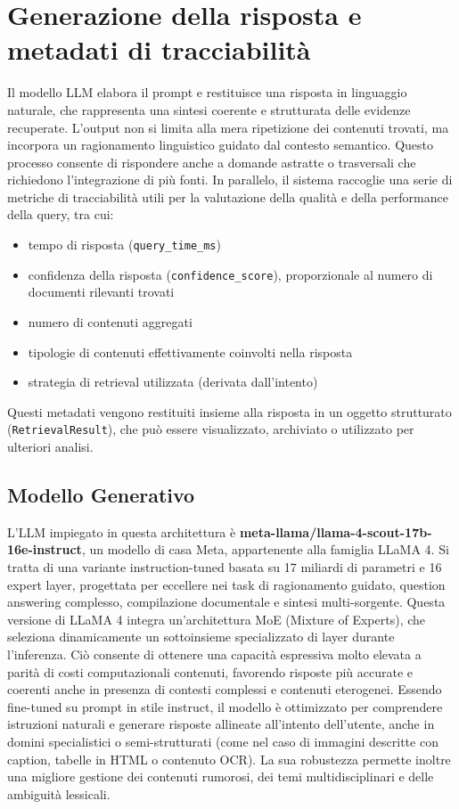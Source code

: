\section{Generazione della risposta e metadati di tracciabilità}
Il modello LLM elabora il prompt e restituisce una risposta in linguaggio naturale, che rappresenta una sintesi coerente e strutturata delle evidenze recuperate. L’output non si limita alla mera ripetizione dei contenuti trovati, ma incorpora un ragionamento linguistico guidato dal contesto semantico. Questo processo consente di rispondere anche a domande astratte o trasversali che richiedono l’integrazione di più fonti.
In parallelo, il sistema raccoglie una serie di metriche di tracciabilità utili per la valutazione della qualità e della performance della query, tra cui:
\begin{itemize}
    \item tempo di risposta (\verb|query_time_ms|)
    \item confidenza della risposta (\verb|confidence_score|), proporzionale al numero di documenti rilevanti trovati
    \item numero di contenuti aggregati
    \item tipologie di contenuti effettivamente coinvolti nella risposta
    \item strategia di retrieval utilizzata (derivata dall’intento)
\end{itemize}
Questi metadati vengono restituiti insieme alla risposta in un oggetto strutturato (\verb|RetrievalResult|), che può essere visualizzato, archiviato o utilizzato per ulteriori analisi.
\subsection{Modello Generativo}
L’LLM impiegato in questa architettura è \textbf{meta-llama/llama-4-scout-17b-16e-instruct}, un modello  di casa Meta, appartenente alla famiglia LLaMA 4. Si tratta di una variante instruction-tuned basata su 17 miliardi di parametri e 16 expert layer, progettata per eccellere nei task di ragionamento guidato, question answering complesso, compilazione documentale e sintesi multi-sorgente. Questa versione di LLaMA 4 integra un'architettura MoE (Mixture of Experts), che seleziona dinamicamente un sottoinsieme specializzato di layer durante l’inferenza. Ciò consente di ottenere una capacità espressiva molto elevata a parità di costi computazionali contenuti, favorendo risposte più accurate e coerenti anche in presenza di contesti complessi e contenuti eterogenei.
Essendo fine-tuned su prompt in stile instruct, il modello è ottimizzato per comprendere istruzioni naturali e generare risposte allineate all’intento dell’utente, anche in domini specialistici o semi-strutturati (come nel caso di immagini descritte con caption, tabelle in HTML o contenuto OCR). La sua robustezza permette inoltre una migliore gestione dei contenuti rumorosi, dei temi multidisciplinari e delle ambiguità lessicali.
